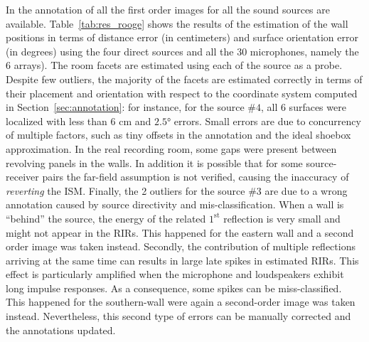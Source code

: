 In \dEchorate{} the annotation of all the first order images for all the sound sources are available. Table~\ref{tab:res_rooge} shows the results of the estimation of the wall positions in terms of distance error (in centimeters) and surface orientation error (in degrees) using the four direct sources and all the 30 microphones, namely the 6 arrays). The room facets are estimated using each of the source as a probe. Despite few outliers, the majority of the facets are estimated correctly in terms of their placement and orientation with respect to the coordinate system computed in Section~\ref{sec:annotation}: for instance, for the source $\#4$, all 6 surfaces were localized with less than $6$ cm and $\ang{2.5}$ errors. Small errors are due to concurrency of multiple factors, such as tiny offsets in the annotation and the ideal shoebox approximation. In the real recording room, some gaps were present between revolving panels in the walls. In addition it is possible that for some source-receiver pairs the far-field assumption is not verified, causing the inaccuracy of \textit{reverting} the ISM. Finally, the 2 outliers for the source $\#3$ are due to a wrong annotation caused by source directivity and mis-classification. When a wall is ``behind'' the source, the energy of the related $1^\text{st}$ reflection is very small and might not appear in the RIRs. This happened for the eastern wall and a second order image was taken instead. Secondly, the contribution of multiple reflections arriving at the same time can results in large late spikes in estimated RIRs. This effect is particularly amplified when the microphone and loudspeakers exhibit long impulse responses. As a consequence, some spikes can be miss-classified. This happened for the southern-wall were again a second-order image was taken instead. Nevertheless, this second type of errors can be manually corrected and the annotations updated.




